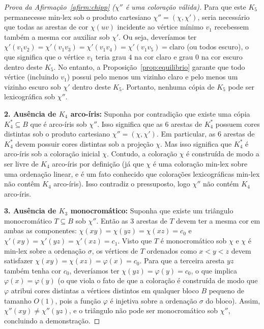 \documentclass[reqno, 12pt]{amsart}
\numberwithin{equation}{section}
\theoremstyle{plain}
\theoremstyle{definition}
\begin{document}
\begin{proof}[Prova da Afirmação~\ref{afirm:chipp} ($\chi''$ é uma coloração válida)]
    Para que este $K_5$ permanecesse min-lex sob o produto cartesiano $\chi'' = (\chi, \chi')$, seria necessário que todas as arestas de cor $\chi(uv)$ incidente ao vértice mínimo $v_1$ recebessem também a mesma cor auxiliar sob $\chi'$. Ou seja, deveríamos ter $\chi'(v_1v_2) = \chi'(v_1v_3) = \chi'(v_1v_4) = \chi'(v_1v_5) = \text{claro}$ (ou todos escuro), o que significa que o vértice $v_1$ teria grau $4$ na cor claro e grau $0$ na cor escuro dentro deste $K_5$.
    No entanto, a Proposição~\ref{prop:equilibrio} garante que todo vértice (incluindo $v_1$) possui pelo menos um vizinho claro e pelo menos um vizinho escuro sob $\chi'$ dentro deste $K_5$. Portanto, nenhuma cópia de $K_5$ pode ser lexicográfica sob $\chi''$.

    \medskip
    \noindent\textbf{2. Ausência de $K_4$ arco-íris:}
    Suponha por contradição que existe uma cópia $K_4^* \subseteq B$ que é arco-íris sob $\chi''$.
    Isso significa que as $6$ arestas de $K_4^*$ possuem cores distintas sob o produto cartesiano $\chi'' = (\chi, \chi')$.
    Em particular, as $6$ arestas de $K_4^*$ devem possuir cores distintas sob a projeção $\chi$.
    Mas isso significa que $K_4^*$ é arco-íris sob a coloração inicial $\chi$.
    Contudo, a coloração $\chi$ é construída de modo a ser livre de $K_4$ arco-íris por definição (já que $\chi$ é uma coloração min-lex sobre uma ordenação linear, e é um fato conhecido que colorações lexicográficas min-lex não contêm $K_4$ arco-íris).
    Isso contradiz o pressuposto, logo $\chi''$ não contém $K_4$ arco-íris.

    \medskip
    \noindent\textbf{3. Ausência de $K_3$ monocromático:}
    Suponha que existe um triângulo monocromático $T \subseteq B$ sob $\chi''$.
    Então as $3$ arestas de $T$ devem ter a mesma cor em ambas as componentes:
    $\chi(xy) = \chi(yz) = \chi(xz) = c_0$ e $\chi'(xy) = \chi'(yz) = \chi'(xz) = c_1$.
    Visto que $T$ é monocromático sob $\chi$ e $\chi$ é min-lex sobre a ordenação $\sigma$, os vértices de $T$ ordenados como $x < y < z$ devem satisfazer $\chi(xy) = \chi(xz) = \varphi(x) = c_0$.
    Para que a terceira aresta $yz$ também tenha cor $c_0$, deveríamos ter $\chi(yz) = \varphi(y) = c_0$, o que implica $\varphi(x) = \varphi(y)$ (o que viola o fato de que a coloração é construída de modo que $\varphi$ atribui cores distintas a vértices distintos em qualquer bloco $B$ pequeno de tamanho $O(1)$, pois a função $\varphi$ é injetiva sobre a ordenação $\sigma$ do bloco).
    Assim, $\chi''(xy) \ne \chi''(yz)$, e o triângulo não pode ser monocromático sob $\chi''$, concluindo a demonstração.
\end{proof}
\end{document}
